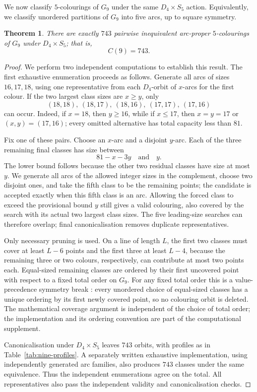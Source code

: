 \documentclass[11pt]{article}
\newtheorem{theorem}{Theorem}
\theoremstyle{definition}
\theoremstyle{remark}
\newcommand{\Dfour}{D_4}
\renewcommand{\ge}{\geqslant}
\renewcommand{\le}{\leqslant}
\begin{document}
We now classify \(5\)-colourings of \(G_9\) under the same
\(\Dfour\times S_5\) action.  Equivalently, we classify unordered partitions
of \(G_9\) into five arcs, up to square symmetry.

\begin{theorem}\label{thm:nine-classification}
There are exactly \(743\) pairwise inequivalent arc-proper
\(5\)-colourings of \(G_9\) under \(\Dfour\times S_5\); that is,
\[
  C(9)=743.
\]
\end{theorem}

\begin{proof}
We perform two independent computations to establish this result. The first exhaustive enumeration proceeds as follows.  Generate all arcs of
sizes \(16,17,18\), using one representative from each \(\Dfour\)-orbit of
\(x\)-arcs for the first colour.  If the two largest class sizes are
\(x\ge y\), only
\[
  (18,18),\ (18,17),\ (18,16),\ (17,17),\ (17,16)
\]
can occur.  Indeed, if \(x=18\), then \(y\ge16\), while if \(x\le17\), then
\(x=y=17\) or \((x,y)=(17,16)\); every omitted alternative has total
capacity less than \(81\).

Fix one of these pairs.  Choose an \(x\)-arc and a disjoint \(y\)-arc.  Each
of the three remaining final classes has size between
\[
  81-x-3y \quad\text{and}\quad y.
\]
The lower bound follows because the other two residual classes have size at
most \(y\).  We generate all arcs of the allowed integer sizes in the
complement, choose two disjoint ones, and take the fifth class to be the
remaining points; the candidate is accepted exactly when this fifth class is
an arc.  Allowing the forced class to exceed the provisional bound \(y\)
still gives a valid colouring, also covered by the search with its actual
two largest class sizes.  The five leading-size searches can therefore
overlap; final canonicalisation removes duplicate representatives.

Only necessary pruning is used.  On a line of length \(L\), the first two
classes must cover at least \(L-6\) points and the first three at least
\(L-4\), because the remaining three or two colours, respectively, can contribute at most
two points each.  Equal-sized remaining classes are ordered by their first uncovered point
with respect to a fixed total order on \(G_9\).  For any fixed total order this
is a value-precedence symmetry break \cite{Walsh2006}: every unordered choice of
equal-sized classes has a unique ordering by its first newly covered point, so
no colouring orbit is deleted.  The mathematical coverage argument is
independent of the choice of total order; the implementation and its ordering
convention are part of the computational supplement.

Canonicalisation under \(\Dfour\times S_5\) leaves \(743\) orbits, with
profiles as in Table~\ref{tab:nine-profiles}.  A separately written
exhaustive implementation, using independently generated arc families, also
produces \(743\) classes under the same equivalence.  Thus the independent
enumerations agree on the total.  All representatives also pass the
independent validity and canonicalisation checks.
\end{proof}
\end{document}
